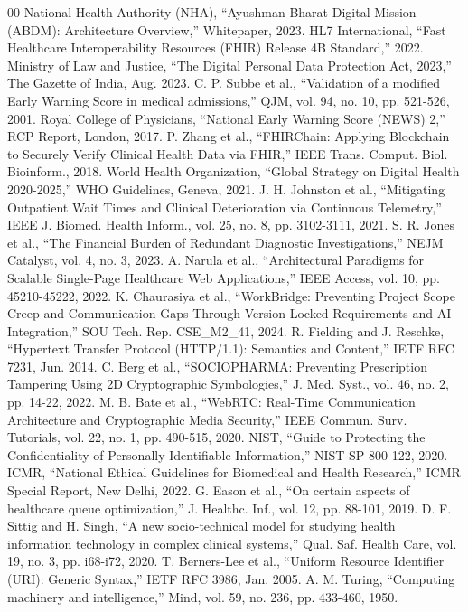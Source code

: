 \documentclass[conference]{IEEEtran}
\begin{document}
\begin{thebibliography}{00}
 National Health Authority (NHA), ``Ayushman Bharat Digital Mission (ABDM): Architecture Overview,'' Whitepaper, 2023.
 HL7 International, ``Fast Healthcare Interoperability Resources (FHIR) Release 4B Standard,'' 2022.
 Ministry of Law and Justice, ``The Digital Personal Data Protection Act, 2023,'' The Gazette of India, Aug. 2023.
 C. P. Subbe et al., ``Validation of a modified Early Warning Score in medical admissions,'' QJM, vol. 94, no. 10, pp. 521-526, 2001.
 Royal College of Physicians, ``National Early Warning Score (NEWS) 2,'' RCP Report, London, 2017.
 P. Zhang et al., ``FHIRChain: Applying Blockchain to Securely Verify Clinical Health Data via FHIR,'' IEEE Trans. Comput. Biol. Bioinform., 2018.
 World Health Organization, ``Global Strategy on Digital Health 2020-2025,'' WHO Guidelines, Geneva, 2021.
 J. H. Johnston et al., ``Mitigating Outpatient Wait Times and Clinical Deterioration via Continuous Telemetry,'' IEEE J. Biomed. Health Inform., vol. 25, no. 8, pp. 3102-3111, 2021.
 S. R. Jones et al., ``The Financial Burden of Redundant Diagnostic Investigations,'' NEJM Catalyst, vol. 4, no. 3, 2023.
 A. Narula et al., ``Architectural Paradigms for Scalable Single-Page Healthcare Web Applications,'' IEEE Access, vol. 10, pp. 45210-45222, 2022.
 K. Chaurasiya et al., ``WorkBridge: Preventing Project Scope Creep and Communication Gaps Through Version-Locked Requirements and AI Integration,'' SOU Tech. Rep. CSE\_M2\_41, 2024.
 R. Fielding and J. Reschke, ``Hypertext Transfer Protocol (HTTP/1.1): Semantics and Content,'' IETF RFC 7231, Jun. 2014.
 C. Berg et al., ``SOCIOPHARMA: Preventing Prescription Tampering Using 2D Cryptographic Symbologies,'' J. Med. Syst., vol. 46, no. 2, pp. 14-22, 2022.
 M. B. Bate et al., ``WebRTC: Real-Time Communication Architecture and Cryptographic Media Security,'' IEEE Commun. Surv. Tutorials, vol. 22, no. 1, pp. 490-515, 2020.
 NIST, ``Guide to Protecting the Confidentiality of Personally Identifiable Information,'' NIST SP 800-122, 2020.
 ICMR, ``National Ethical Guidelines for Biomedical and Health Research,'' ICMR Special Report, New Delhi, 2022.
 G. Eason et al., ``On certain aspects of healthcare queue optimization,'' J. Healthc. Inf., vol. 12, pp. 88-101, 2019.
 D. F. Sittig and H. Singh, ``A new socio-technical model for studying health information technology in complex clinical systems,'' Qual. Saf. Health Care, vol. 19, no. 3, pp. i68-i72, 2020.
 T. Berners-Lee et al., ``Uniform Resource Identifier (URI): Generic Syntax,'' IETF RFC 3986, Jan. 2005.
 A. M. Turing, ``Computing machinery and intelligence,'' Mind, vol. 59, no. 236, pp. 433-460, 1950.
\end{thebibliography}
\end{document}
